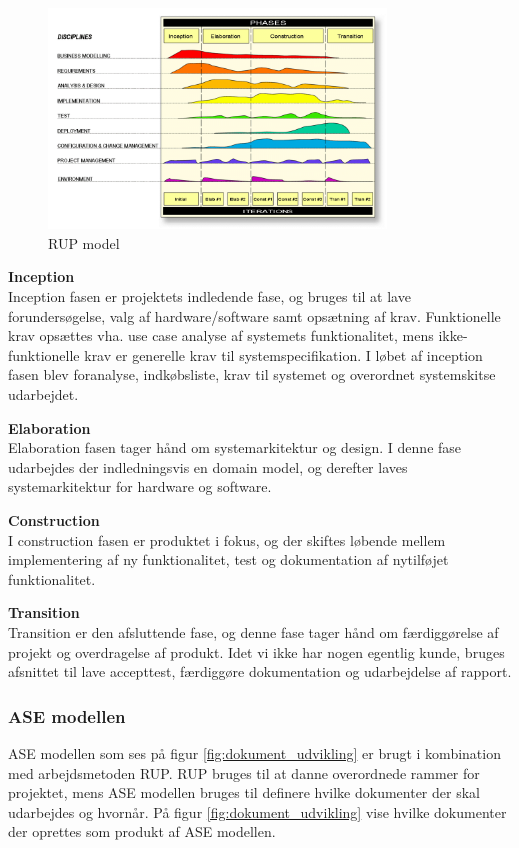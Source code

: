 \begin{figure}[H]
	\centering
	\includegraphics[width=0.80\textwidth]{Billeder/Udviklingsproces/RUP}
	\caption{RUP model}
	\label{fig:rup}
\end{figure}

\textbf{Inception}\\
Inception fasen er projektets indledende fase, og bruges til at lave forundersøgelse, valg af hardware/software samt opsætning af krav. Funktionelle krav opsættes vha. use case analyse af systemets funktionalitet, mens ikke-funktionelle krav er generelle krav til systemspecifikation.
I løbet af inception fasen blev foranalyse, indkøbsliste, krav til systemet og overordnet systemskitse udarbejdet. 

\textbf{Elaboration}\\
Elaboration fasen tager hånd om systemarkitektur og design. I denne fase udarbejdes der indledningsvis en domain model, og derefter laves systemarkitektur for hardware og software. 

\textbf{Construction}\\
I construction fasen er produktet i fokus, og der skiftes løbende mellem implementering af ny funktionalitet, test og dokumentation af nytilføjet funktionalitet. 

\textbf{Transition}\\
Transition er den afsluttende fase, og denne fase tager hånd om færdiggørelse af projekt og overdragelse af produkt. Idet vi ikke har nogen egentlig kunde, bruges afsnittet til lave accepttest, færdiggøre dokumentation og udarbejdelse af rapport. 

\newpage

\subsubsection{ASE modellen}
ASE modellen som ses på figur \ref{fig:dokument_udvikling} er brugt i kombination med arbejdsmetoden RUP. RUP bruges til at danne overordnede rammer for projektet, mens ASE modellen bruges til definere hvilke dokumenter der skal udarbejdes og hvornår. På figur \ref{fig:dokument_udvikling} vise hvilke dokumenter der oprettes som produkt af ASE modellen. 

